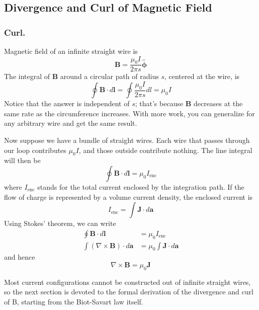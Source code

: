 \documentclass[../../../main.tex]{subfiles}
\begin{document}
\subsection*{Divergence and Curl of Magnetic Field}
\subsubsection*{Curl.} Magnetic field of an inﬁnite straight wire is
\begin{equation*}
    \mathbf{B}=\frac{\mu_0I}{2\pi s}\boldsymbol{\hat{\phi}}
\end{equation*}
The integral of \textbf{B} around a circular path of radius $s$, centered at the wire, is
\begin{equation*}
    \oint \mathbf{B}\cdot d\mathbf{l}=\oint\frac{\mu_0I}{2\pi s}dl=\mu_0I
\end{equation*}
Notice that the answer is independent of $s$; that's because \textbf{B} decreases at the same rate as the circumference increases. With more work, you can generalize for any arbitrary wire and get the same result. 

Now suppose we have a bundle of straight wires. Each wire that passes through our loop contributes $\mu_0 I$, and those outside contribute nothing. The line integral will then be
\begin{equation*}
    \oint \mathbf{B}\cdot d\mathbf{l}=\mu_0I_{\text{enc}}
\end{equation*}
where $I_{\text{enc}}$ stands for the total current enclosed by the integration path. If the ﬂow 
of charge is represented by a volume current density, the enclosed current is
\begin{equation*}
    I_{\text{enc}}=\int \mathbf{J}\cdot d\mathbf{a}
\end{equation*}
Using Stokes' theorem, we can write 
\begin{align*}
    \oint \mathbf{B}\cdot d\mathbf{l}&=\mu_0I_{\text{enc}}\\
    \int(\nabla \times \mathbf{B})\cdot d\mathbf{a}&=\mu_0\int \mathbf{J}\cdot d\mathbf{a}
\end{align*}
and hence
\begin{equation*}
    \nabla \times \mathbf{B}=\mu_0\mathbf{J} 
\end{equation*}

Most current conﬁgurations cannot be constructed out of inﬁnite straight wires, so the next section is devoted to the formal derivation of the divergence and curl of B, starting from the Biot-Savart law itself.
\end{document}
